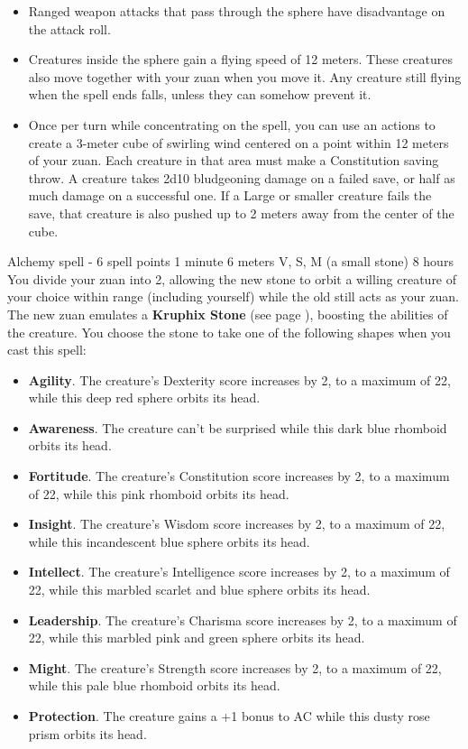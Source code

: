     \begin{itemize}
        \item Ranged weapon attacks that pass through the sphere have disadvantage on the attack roll.
        \item Creatures inside the sphere gain a flying speed of 12 meters.
        These creatures also move together with your zuan when you move it.
        Any creature still flying when the spell ends falls, unless they can somehow prevent it.
        \item Once per turn while concentrating on the spell, you can use an actions to create a 3-meter cube of swirling wind centered on a point within 12 meters of your zuan.
        Each creature in that area must make a Constitution saving throw.
        A creature takes 2d10 bludgeoning damage on a failed save, or half as much damage on a successful one.
        If a Large or smaller creature fails the save, that creature is also pushed up to 2 meters away from the center of the cube.
    \end{itemize}
    {Alchemy spell - 6 spell points}
    {1 minute}
    {6 meters}
    {V, S, M (a small stone)}
    {8 hours}
    You divide your zuan into 2, allowing the new stone to orbit a willing creature of your choice within range (including yourself) while the old still acts as your zuan.
    The new zuan emulates a \textbf{Kruphix Stone} (see page \pageref{item::kruphixstone}), boosting the abilities of the creature.
    You choose the stone to take one of the following shapes when you cast this spell:
    \begin{itemize}
        \item \textbf{Agility}.
        The creature's Dexterity score increases by 2, to a maximum of 22, while this deep red sphere orbits its head.
        \item \textbf{Awareness}.
        The creature can't be surprised while this dark blue rhomboid orbits its head.
        \item \textbf{Fortitude}.
        The creature's Constitution score increases by 2, to a maximum of 22, while this pink rhomboid orbits its head.
        \item \textbf{Insight}.
        The creature's Wisdom score increases by 2, to a maximum of 22, while this incandescent blue sphere orbits its head.
        \item \textbf{Intellect}.
        The creature's Intelligence score increases by 2, to a maximum of 22, while this marbled scarlet and blue sphere orbits its head.
        \item \textbf{Leadership}.
        The creature's Charisma score increases by 2, to a maximum of 22, while this marbled pink and green sphere orbits its head.
        \item \textbf{Might}.
        The creature's Strength score increases by 2, to a maximum of 22, while this pale blue rhomboid orbits its head.
        \item \textbf{Protection}.
        The creature gains a +1 bonus to AC while this dusty rose prism orbits its head.
    \end{itemize}

